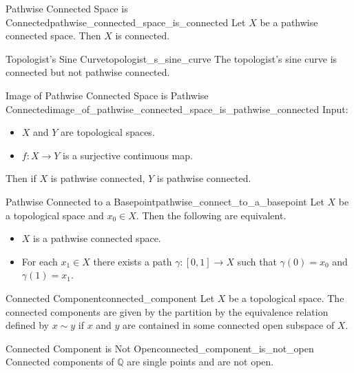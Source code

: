\documentclass{article}
\begin{document}
\begin{theorem}{Pathwise Connected Space is Connected}{pathwise_connected_space_is_connected}
    Let $X$ be a pathwise connected space.
    Then $X$ is connected.
\end{theorem}

\begin{counterexample}{Topologist's Sine Curve}{topologist_s_sine_curve}
    The topologist's sine curve is connected but not pathwise connected.
\end{counterexample}

\begin{theorem}{Image of Pathwise Connected Space is Pathwise Connected}{image_of_pathwise_connected_space_is_pathwise_connected}
    Input:
    \begin{itemize}
        \item $X$ and $Y$ are topological spaces.
        \item $f:X\rightarrow Y$ is a surjective continuous map.
    \end{itemize}
    Then if $X$ is pathwise connected, $Y$ is pathwise connected.
\end{theorem}

\begin{lemma}{Pathwise Connected to a Basepoint}{pathwise_connect_to_a_basepoint}
    Let $X$ be a topological space and $x_0\in X$.
    Then the following are equivalent.
    \begin{itemize}
        \item $X$ is a pathwise connected space.
        \item For each $x_1\in X$ there exists a path $\gamma:[0,1] \rightarrow X$ such that $\gamma(0) = x_0$ and $\gamma(1) = x_1$.
    \end{itemize}
\end{lemma}

\begin{definition}{Connected Component}{connected_component}
    Let $X$ be a topological space.
    The connected components are given by the partition by the equivalence relation defined by $x\sim y$ if $x$ and $y$ are contained in some connected open subspace of $X$.
\end{definition}

\begin{counterexample}{Connected Component is Not Open}{connected_component_is_not_open}
    Connected components of $\mathbb{Q}$ are single points and are not open.
\end{counterexample}
\end{document}
